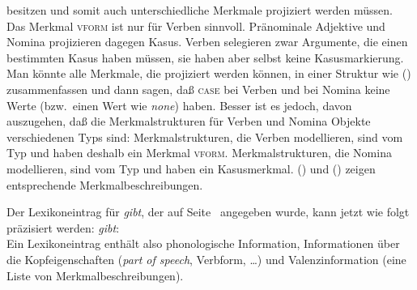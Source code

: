besitzen und somit auch unterschiedliche Merkmale projiziert werden müssen.
Das Merkmal \textsc{vform} ist nur für Verben sinnvoll. Pränominale Adjektive und 
Nomina projizieren dagegen Kasus. Verben selegieren zwar Argumente, die einen
bestimmten Kasus haben müssen, sie haben aber selbst keine Kasusmarkierung.
Man könnte alle Merkmale, die projiziert werden können, in einer Struktur wie
() zusammenfassen und dann sagen, daß \textsc{case} bei Verben und \vform
bei Nomina keine Werte (bzw.\ einen Wert wie \emph{none}) haben.
\ea
\z
Besser ist es jedoch, davon auszugehen, daß die Merkmalstrukturen für
Verben und Nomina Objekte verschiedenen Typs sind: Merkmalstrukturen,
die Verben modellieren, sind vom Typ  und haben deshalb
ein Merkmal \textsc{vform}. Merkmalstrukturen, die Nomina modellieren,
sind vom Typ  und haben ein
Kasusmerkmal\label{page-ref-case-feat}. () und () zeigen entsprechende
Merkmalbeschreibungen.
\ea
{}
\z
\ea
\z

\noindent
Der Lexikoneintrag für \emph{gibt}, der auf Seite~\pageref{le-gibt-1}
angegeben wurde, kann jetzt wie folgt präzisiert werden:
\ea
\textit{gibt\/}:\\
\z
Ein Lexikoneintrag enthält also phonologische Information, Informationen über die Kopfeigenschaften (\emph{part of speech}, Verbform, \ldots)
und Valenzinformation (eine Liste von Merkmalbeschreibungen).


